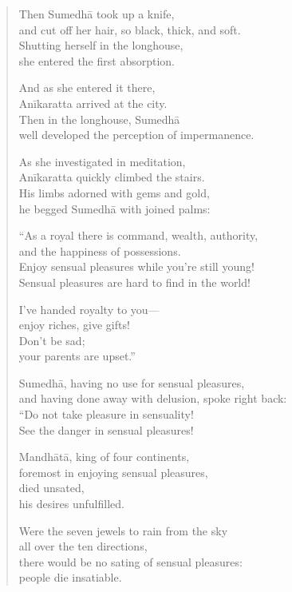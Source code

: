 \documentclass[12pt,openany]{book}%
\begin{document}
\begin{verse}
Then \textsanskrit{Sumedhā} took up a knife, \\
and cut off her hair, so black, thick, and soft. \\
Shutting herself in the longhouse, \\
she entered the first absorption. 

And as she entered it there, \\
\textsanskrit{Anīkaratta} arrived at the city. \\
Then in the longhouse, \textsanskrit{Sumedhā} \\
well developed the perception of impermanence. 

As she investigated in meditation, \\
\textsanskrit{Anīkaratta} quickly climbed the stairs. \\
His limbs adorned with gems and gold, \\
he begged \textsanskrit{Sumedhā} with joined palms: 

“As a royal there is command, wealth, authority, \\
and the happiness of possessions. \\
Enjoy sensual pleasures while you’re still young! \\
Sensual pleasures are hard to find in the world! 

I’ve handed royalty to you—\\
enjoy riches, give gifts! \\
Don’t be sad; \\
your parents are upset.” 

\textsanskrit{Sumedhā}, having no use for sensual pleasures, \\
and having done away with delusion, spoke right back: \\
“Do not take pleasure in sensuality! \\
See the danger in sensual pleasures! 

\textsanskrit{Mandhātā}, king of four continents, \\
foremost in enjoying sensual pleasures, \\
died unsated, \\
his desires unfulfilled. 

Were the seven jewels to rain from the sky \\
all over the ten directions, \\
there would be no sating of sensual pleasures: \\
people die insatiable. 


\end{verse}
\end{document}
